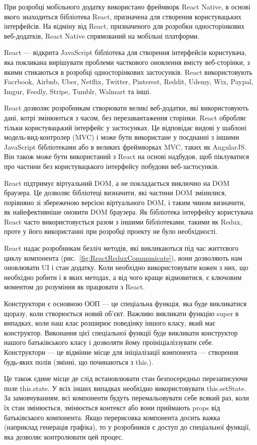 При розробці мобільного додатку використано фреймворк React Native, в основі якого знаходиться бібліотека React, призначена для створення користувацьких інтерфейсів. На відміну від React, призначеного для розробки односторінкових веб-додатків, React Native спрямований на мобільні платформи.

React — відкрита JavaScript бібліотека для створення інтерфейсів користувача, яка покликана вирішувати проблеми часткового оновлення вмісту веб-сторінки, з якими стикаються в розробці односторінкових застосунків. React використовують Facrbook, Airbnb, Uber, Netflix, Twitter, Pinterest, Reddit, Udemy, Wix, Paypal, Imgur, Feedly, Stripe, Tumblr, Walmart та інші.

React дозволяє розробникам створювати великі веб-додатки, які використовують дані, котрі змінюються з часом, без перезавантаження сторінки. React обробляє тільки користувацький інтерфейс у застосунках. Це відповідає видові у шаблоні модель-вид-контролер (MVC) і може бути використане у поєднанні з іншими JavaScript бібліотеками або в великих фреймворках MVC, таких як AngularJS. Він також може бути використаний з React на основі надбудов, щоб піклуватися про частини без користувацького інтерфейсу побудови веб-застосунків.

React підтримує віртуальний DOM, а не покладається виключно на DOM браузера. Це дозволяє бібліотеці визначити, які частини DOM змінилися, порівняно зі збереженою версією віртуального DOM, і таким чином визначити, як найефективніше оновити DOM браузера. Як бібліотека інтерфейсу користувача React часто використовується разом з іншими бібліотеками, такими як Redux, проте у його використанні при розробці проекту не було необхідності.

React надає розробникам безліч методів, які викликаються під час життєвого циклу компонента (рис.~\ref{fig:ReactReduxCommunicate}), вони дозволяють нам оновлювати UI і стан додатку. Коли необхідно використовувати кожен з них, що необхідно робити і в яких методах, а від чого краще відмовитися, є ключовим моментом до розуміння як працювати з React.


Конструктори є основною ООП — це спеціальна функція, яка буде викликатися щоразу, коли створюється новий об'єкт. Важливо викликати функцію super в випадках, коли наш клас розширює поведінку іншого класу, який має конструктор. Виконання цієї спеціальної функції буде викликати конструктор нашого батьківського класу і дозволяти йому проініціаліззувати себе. 
Конструктори —  це відмінне місце для ініціалізації компонента —  створення будь-яких полів (змінні, що починаються з this.).

Це також єдине місце де слід встановлювати стан безпосередньо перезаписуючи поле this.state. У всіх інших випадках необхідно використовувати this.setState.
За замовчуванням, всі компоненти будуть перемальовувати себе всякий раз, коли їх стан змінюється, змінюється контекст або вони приймають props від батьківського компонента. Якщо перерисовка компонента досить важка (наприклад генерація графіка), то у розробників є доступ до спеціальної функції, яка дозволяє контролювати цей процес.
